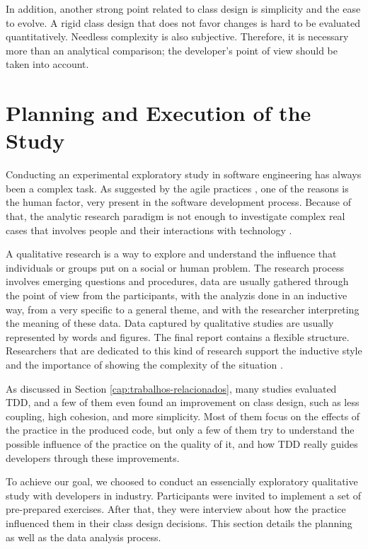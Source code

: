 \documentclass[conference]{IEEEtran}
\begin{document}
In addition, another strong point related to class design is simplicity and
the ease to evolve. A rigid class design that does not favor changes is hard
to be evaluated quantitatively. Needless complexity is also subjective.
Therefore, it is necessary more than an analytical comparison; the
developer's point of view should be taken into account.

\section{Planning and Execution of the Study} 
\label{sec:planejamento}

Conducting an experimental exploratory study in software engineering has always
been a complex task. As suggested by the agile practices \cite{AgileManifesto}, 
one of the reasons is the human factor, very present in 
the software development process. Because of that, the analytic research
paradigm is not enough to investigate complex real cases that involves people
and their interactions with technology \cite{guidelines-case-study}.

A qualitative research is a way to explore and understand the influence that
individuals or groups put on a social or human problem. The research process
involves emerging questions and procedures, data are usually gathered through
the point of view from the participants, with the analyzis done in an inductive
way, from a very specific to a general theme, and with the researcher interpreting
the meaning of these data. Data captured by qualitative studies are usually
represented by words and figures. The final report contains a flexible structure.
Researchers that are dedicated to this kind of research support the inductive style and
the importance of showing the complexity of the situation \cite{creswell}.

As discussed in Section \ref{cap:trabalhos-relacionados}, many studies evaluated
TDD, and a few of them even found an improvement on class design, such as
less coupling, high cohesion, and more simplicity. Most of them focus on
the effects of the practice in the produced code, but only a few of them try to understand
the possible influence of the practice on the quality of it, and how TDD really guides
developers through these improvements.

To achieve our goal, we choosed to conduct an essencially 
exploratory qualitative study with developers in industry. Participants
were invited to implement a set of pre-prepared exercises. After that,
they were interview about how the practice influenced them in their
class design decisions. This section details the planning as well as
the data analysis process.
\end{document}
